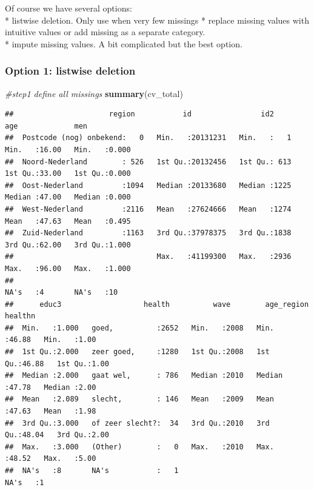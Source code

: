 \documentclass[
]{book}
\newenvironment{Shaded}{\begin{snugshade}}{\end{snugshade}}
\newcommand{\CommentTok}[1]{\textcolor[rgb]{0.56,0.35,0.01}{\textit{#1}}}
\newcommand{\KeywordTok}[1]{\textcolor[rgb]{0.13,0.29,0.53}{\textbf{#1}}}
\newcommand{\NormalTok}[1]{#1}
\begin{document}
Of course we have several options:\\
* listwise deletion. Only use when very few missings
* replace missing values with intuitive values or add missing as a separate category.\\
* impute missing values. A bit complicated but the best option.

\hypertarget{option-1-listwise-deletion}{%
\subsubsection{Option 1: listwise deletion}\label{option-1-listwise-deletion}}

\begin{Shaded}
\begin{Highlighting}[numbers=left,,]
\CommentTok{#step1 define all missings}
\KeywordTok{summary}\NormalTok{(cv_total)}
\end{Highlighting}
\end{Shaded}

\begin{verbatim}
##                      region           id                id2            age             men       
##  Postcode (nog) onbekend:   0   Min.   :20131231   Min.   :   1   Min.   :16.00   Min.   :0.000  
##  Noord-Nederland        : 526   1st Qu.:20132456   1st Qu.: 613   1st Qu.:33.00   1st Qu.:0.000  
##  Oost-Nederland         :1094   Median :20133680   Median :1225   Median :47.00   Median :0.000  
##  West-Nederland         :2116   Mean   :27624666   Mean   :1274   Mean   :47.63   Mean   :0.495  
##  Zuid-Nederland         :1163   3rd Qu.:37978375   3rd Qu.:1838   3rd Qu.:62.00   3rd Qu.:1.000  
##                                 Max.   :41199300   Max.   :2936   Max.   :96.00   Max.   :1.000  
##                                                                   NA's   :4       NA's   :10     
##      educ3                   health          wave        age_region       healthn    
##  Min.   :1.000   goed,          :2652   Min.   :2008   Min.   :46.88   Min.   :1.00  
##  1st Qu.:2.000   zeer goed,     :1280   1st Qu.:2008   1st Qu.:46.88   1st Qu.:1.00  
##  Median :2.000   gaat wel,      : 786   Median :2010   Median :47.78   Median :2.00  
##  Mean   :2.089   slecht,        : 146   Mean   :2009   Mean   :47.63   Mean   :1.98  
##  3rd Qu.:3.000   of zeer slecht?:  34   3rd Qu.:2010   3rd Qu.:48.04   3rd Qu.:2.00  
##  Max.   :3.000   (Other)        :   0   Max.   :2010   Max.   :48.52   Max.   :5.00  
##  NA's   :8       NA's           :   1                                  NA's   :1
\end{verbatim}
\end{document}
